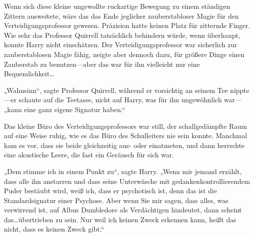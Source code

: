 Wenn sich diese kleine ungewollte ruckartige Bewegung zu einem ständigen Zittern ausweitete, wäre das das Ende jeglicher zauberstabloser Magie für den Verteidigungsprofessor gewesen. Präzision hatte keinen Platz für zitternde Finger. Wie sehr das Professor Quirrell tatsächlich behindern würde, wenn überhaupt, konnte Harry nicht einschätzen. Der Verteidigungsprofessor war sicherlich zur zauberstablosen Magie fähig, neigte aber dennoch dazu, für größere Dinge einen Zauberstab zu benutzen—aber das war für ihn vielleicht nur eine Bequemlichkeit…

„Wahnsinn“, sagte Professor Quirrell, während er vorsichtig an seinem Tee nippte—er schaute auf die Teetasse, nicht auf Harry, was für ihn ungewöhnlich war— „kann eine ganz eigene Signatur haben.“

Das kleine Büro des Verteidigungsprofessors war still, der schallgedämpfte Raum auf eine Weise ruhig, wie es das Büro des Schulleiters nie sein konnte. Manchmal kam es vor, dass sie beide gleichzeitig aus- oder einatmeten, und dann herrschte eine akustische Leere, die fast ein Geräusch für sich war.

„Dem stimme ich in einem Punkt zu“, sagte Harry. „Wenn mir jemand erzählt, dass alle ihn anstarren und dass seine Unterwäsche mit gedankenkontrollierendem Puder bestäubt wird, weiß ich, dass er psychotisch ist, denn das ist die Standardsignatur einer Psychose. Aber wenn Sie mir sagen, dass alles, was verwirrend ist, auf Albus Dumbledore als Verdächtigen hindeutet, dann scheint das…übertrieben zu sein. Nur weil ich keinen Zweck erkennen kann, heißt das nicht, dass es keinen Zweck gibt.“

